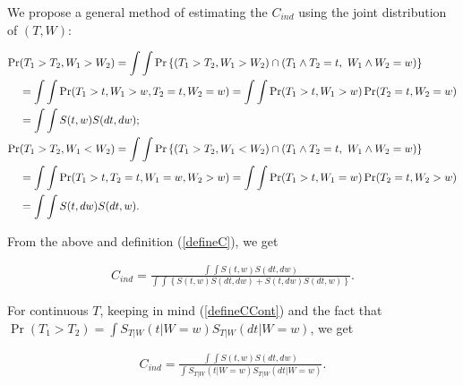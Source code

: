 \documentclass[]{article}\usepackage[]{graphicx}\usepackage[]{color}
\begin{document}
We propose a general method of estimating the $C_{ind}$ using the joint distribution of $(T, W)$:
\begin{linenomath}
\begin{align}
  \Pr&(T_1>T_2, W_1>W_2) = \int \int  \Pr\left\{ (T_1>T_2, W_1>W_2) \cap (T_{1}\wedge T_{2} = t,~W_{1}\wedge W_{2} = w)  \right\}   \notag\\
  &= \int \int \Pr( T_1>t, W_1>w, T_2=t, W_2=w) =\int \int \Pr( T_1>t, W_1>w)\Pr( T_2=t, W_2=w)  \notag\\
  &= \int \int S(t, w)S(dt,dw);  \notag\\
  \Pr&(T_1>T_2, W_1<W_2) = \int \int \Pr\left\{ (T_1>T_2, W_1<W_2) \cap (T_{1}\wedge T_{2} = t,~W_{1}\wedge W_{2} = w) \right\}  \notag \\
  & = \int \int \Pr( T_1>t, T_2=t, W_1=w, W_2>w)= \int \int \Pr( T_1>t, W_1=w) \Pr( T_2=t, W_2>w) \notag  \\
  & = \int \int S(t, dw)S(dt,w). \notag
\end{align}
\end{linenomath}
From the above and definition (\ref{defineC}), we get
\begin{linenomath}
\begin{align}
  \label{cIndexSurvivalPop}
    C_{ind} = \frac{ \int \int S(t, w)S(dt,dw)}{\int \int \left\{S(t, w)S(dt,dw) +  S(t, dw)S(dt,w)\right\} }.
\end{align}
\end{linenomath}
For continuous $T$, keeping in mind (\ref{defineCCont}) and the fact that $\Pr(T_1>T_2) = \int S_{T|W}(t|W = w) S_{T|W}(dt|W= w)$, we get
\begin{linenomath}
\begin{align}
  \label{cIndexSurvivalPopContinuous}
    C_{ind} = \frac{ \int \int S(t, w)S(dt,dw)}{\int S_{T|W}(t|W=w)  S_{T|W}(dt|W=w)}.
\end{align}
\end{linenomath}
\end{document}
